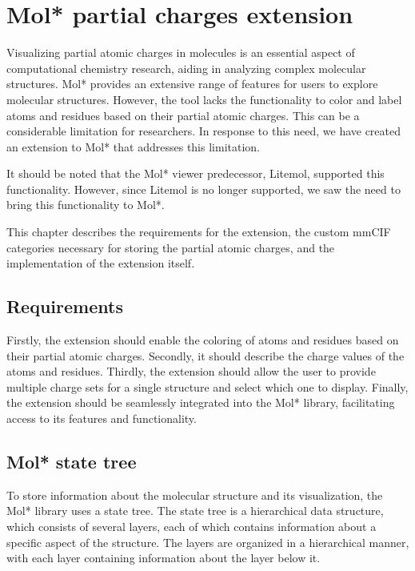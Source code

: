 \documentclass[
  digital,     %
  oneside,     %
  nosansbold,  %
  nocolorbold, %
  lof,         %
  lot,         %
]{fithesis4}
\begin{document}
\newpage
\chapter{Mol* partial charges extension}
\label{chapter:molstar_partial_charges_extension}

Visualizing partial atomic charges in molecules is an essential aspect of computational chemistry research, aiding in analyzing complex molecular structures. Mol* provides an extensive range of features for users to explore molecular structures. However, the tool lacks the functionality to color and label atoms and residues based on their partial atomic charges.
This can be a considerable limitation for researchers. In response to this need, we have created an extension to Mol* that addresses this limitation.

It should be noted that the Mol* viewer predecessor, Litemol, supported this functionality. However, since Litemol is no longer supported, we saw the need to bring this functionality to Mol*.

This chapter describes the requirements for the extension, the custom mmCIF categories necessary for storing the partial atomic charges, and the implementation of the extension itself.

\section{Requirements}
\label{section:requirements}


Firstly, the extension should enable the coloring of atoms and residues based on their partial atomic charges. Secondly, it should describe the charge values of the atoms and residues. Thirdly, the extension should allow the user to provide multiple charge sets for a single structure and select which one to display. Finally, the extension should be seamlessly integrated into the Mol* library, facilitating access to its features and functionality.

\section{Mol* state tree}

To store information about the molecular structure and its visualization, the Mol* library uses a state tree. The state tree is a hierarchical data structure, which consists of several layers, each of which contains information about a specific aspect of the structure. The layers are organized in a hierarchical manner, with each layer containing information about the layer below it.
\end{document}
